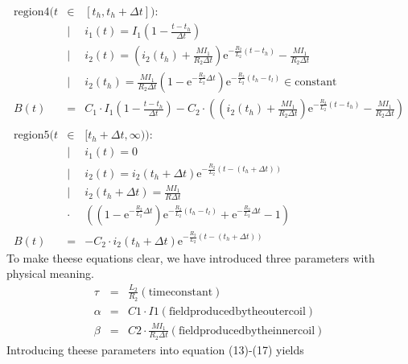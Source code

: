 \begin{eqnarray}
  \mathrm{region 4}(t&\in&[t_h, t_h+\Delta t]):\nonumber\\
  &|& i_1(t) = I_1\left( 1-\frac{t-t_h}{\Delta t} \right)\nonumber\\
  &|& i_2(t) = \left( i_2(t_h)+\frac{MI_1}{R_2\Delta t}\right)\mathrm{e}^{-\frac{R_2}{L_2}(t-t_h)} - \frac{MI_1}{R_2\Delta t} \nonumber\\
  &|& i_2(t_h) = \frac{MI_1}{R_2\Delta t}\left( 1-\mathrm{e}^{-\frac{R_2}{L_2}\Delta t} \right)\mathrm{e}^{-\frac{R_2}{L_2}(t_h-t_l)}\in\mathrm{constant}\nonumber\\
  B(t) &=& C_1\cdot I_1\left( 1-\frac{t-t_h}{\Delta t} \right) - C_2\cdot\left( \left(i_2(t_h)+\frac{MI_1}{R_2\Delta t}\right)\mathrm{e}^{-\frac{R_2}{L_2}(t-t_h)} - \frac{MI_1}{R_2\Delta t} \right)\\
  \nonumber\\
  \mathrm{region 5}(t&\in&[t_h+\Delta t, \infty)):\nonumber\\
  &|& i_1(t) = 0\nonumber\\
  &|& i_2(t) = i_2(t_h+\Delta t)\mathrm{e}^{-\frac{R_2}{L_2}(t-(t_h+\Delta t))}\nonumber\\
  &|& i_2(t_h+\Delta t) = \frac{MI_1}{R\Delta t}\nonumber\\
  &\cdot&\left(\left( 1 -\mathrm{e}^{-\frac{R_2}{L_2}\Delta t} \right)\mathrm{e}^{-\frac{R_2}{L_2}(t_h-t_l)} + \mathrm{e}^{-\frac{R_2}{L_2}\Delta t} - 1 \right)\nonumber\\
  B(t) &=& -C_2\cdot i_2(t_h+\Delta t)\mathrm{e}^{-\frac{R_2}{L_2}(t-(t_h+\Delta t))}
\end{eqnarray}
To make theese equations clear, we have introduced three parameters with physical meaning.
\begin{eqnarray}
  \tau &=& \frac{L_2}{R_2} \mathrm{(time constant)}\\
  \alpha &=& C1\cdot I1 \mathrm{(field produced by the outer coil)}\\
  \beta &=& C2\cdot\frac{MI_1}{R_2\Delta t} \mathrm{(field produced by the inner coil)}
\end{eqnarray}
Introducing theese parameters into equation (13)-(17) yields
